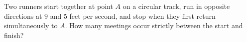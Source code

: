 Two runners start together at point $ A $ on a circular track, run in opposite directions at $ 9 $ and $ 5 $ feet per second, and stop when they first return simultaneously to $ A $. How many meetings occur strictly between the start and finish?
